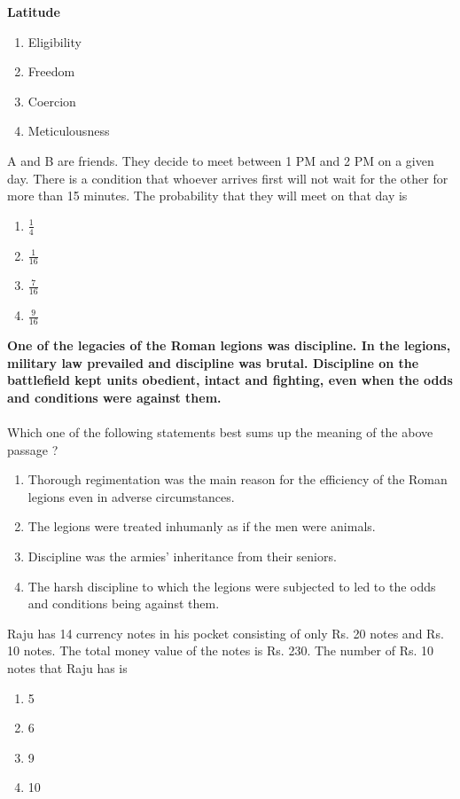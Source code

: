 \textbf{Latitude}
\begin{enumerate}
    \item Eligibility
    \item Freedom
    \item Coercion
    \item Meticulousness  \\
 \end{enumerate}
\item A and B are friends. They decide to meet between 1 PM and 2 PM on a given day. There is a condition that whoever arrives first will not wait for the other for more than 15 minutes. The probability that they will meet on that day is
\begin{enumerate}
     \item $\frac{1}{4}$
     \item $\frac{1}{16}$
     \item $\frac{7}{16}$
     \item $\frac{9}{16}$ \\
 \end{enumerate}
\item \textbf{One of the legacies of the Roman legions was discipline. In the legions, military law prevailed and discipline was brutal. Discipline on the battlefield kept units obedient, intact and fighting, even when the odds and conditions were against them.}\\\\
Which one of the following statements best sums up the meaning of the above passage ?
\begin{enumerate}
    \item Thorough regimentation was the main reason for the efficiency of the Roman legions even in adverse circumstances. 
    \item The legions were treated inhumanly as if the men were animals.
    \item Discipline was the armies' inheritance from their seniors.
    \item The harsh discipline to which the legions were subjected to led to the odds and conditions being against them. \\
\end{enumerate}
\item Raju has 14 currency notes in his pocket consisting of only Rs. 20 notes and Rs. 10 notes. The total money value of the notes is Rs. 230. The number of Rs. 10 notes that Raju has is
\begin{enumerate}
    \item 5
    \item 6
    \item 9
    \item 10 \\
\end{enumerate}
